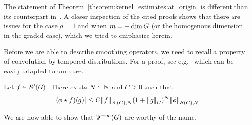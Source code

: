 \begin{remark}
    The statement of Theorem~\ref{theorem:kernel_estimates:at_origin} is different than its counterpart in~\cite{Fischer2015,FischerRuzhansky16,FischerRuzhansky16}.
    A closer inspection of the cited proofs shows that there are issues for the case $\rho = 1$ and when $m = -\dim \Group$ (or the homogenous dimension in the graded case),
    which we tried to emphasize herein.
\end{remark}

Before we are able to describe smoothing operators,
we need to recall a property of convolution by tempered distributions.
For a proof, see e.g.~\cite[Lemma 3.1.55]{FischerRuzhansky16} which can be easily adapted to our case.

\begin{lemma}
\label{lemma:continuity_of_convolutions}
    Let $f \in \TemperedDistributions \Group$.
    There exists $N \in \N$ and $C \geq 0$ such that
    \begin{align*}
        \abs {(\conv \phi f)(g)}
        \leq
        C
        \seminorm [\TemperedDistributions \Group] N f
        (1 + \norm [\Group] g)^N
        \seminorm [\Schwartz \Group] N \phi
    \end{align*}
\end{lemma}

We are now able to show that $\SmoothingOperators$ are worthy of the name.

